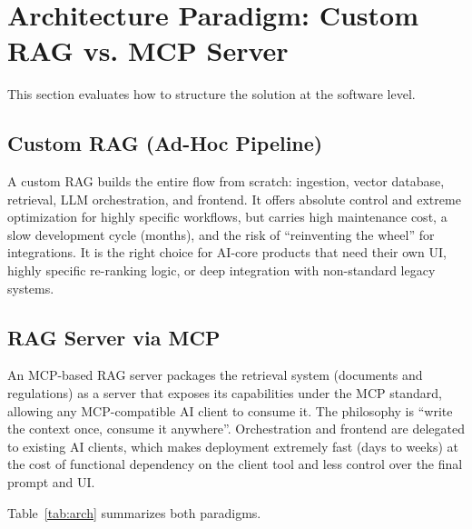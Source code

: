 \documentclass[11pt,a4paper]{article}
\begin{document}
\section{Architecture Paradigm: Custom RAG vs. MCP Server}
\label{sec:architecture}

This section evaluates how to structure the solution at the software level.

\subsection{Custom RAG (Ad-Hoc Pipeline)}

A custom RAG builds the entire flow from scratch: ingestion, vector database,
retrieval, LLM orchestration, and frontend. It offers absolute control and
extreme optimization for highly specific workflows, but carries high
maintenance cost, a slow development cycle (months), and the risk of
``reinventing the wheel'' for integrations. It is the right choice for
AI-core products that need their own UI, highly specific re-ranking logic, or
deep integration with non-standard legacy systems.

\subsection{RAG Server via MCP}

An MCP-based RAG server packages the retrieval system (documents and
regulations) as a server that exposes its capabilities under the MCP
standard, allowing any MCP-compatible AI client to consume it. The philosophy
is ``write the context once, consume it anywhere''. Orchestration and
frontend are delegated to existing AI clients, which makes deployment
extremely fast (days to weeks) at the cost of functional dependency on the
client tool and less control over the final prompt and UI.

Table~\ref{tab:arch} summarizes both paradigms.
\end{document}

